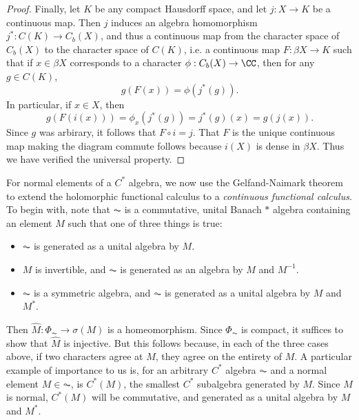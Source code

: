 \begin{proof}
    Finally, let $K$ be any compact Hausdorff space, and let $j: X \to K$ be a continuous map. Then $j$ induces an algebra homomorphism $j^*: C(K) \to C_b(X)$, and thus a continuous map from the character space of $C_b(X)$ to the character space of $C(K)$, i.e. a continuous map $F: \beta X \to K$ such that if $x \in \beta X$ corresponds to a character $\phi: C_b(X) \to \CC$, then for any $g \in C(K)$,
    \[ g(F(x)) = \phi(j^*(g)). \]
    In particular, if $x \in X$, then
    \[ g(F(i(x))) = \phi_x(j^*(g)) = j^*(g)(x) = g(j(x)). \]
    Since $g$ was arbirary, it follows that $F \circ i = j$. That $F$ is the unique continuous map making the diagram commute follows because $i(X)$ is dense in $\beta X$. Thus we have verified the universal property.
\end{proof}

For normal elements of a $C^*$ algebra, we now use the Gelfand-Naimark theorem to extend the holomorphic functional calculus to a \emph{continuous functional calculus}. To begin with, note that $\AC$ is a commutative, unital Banach $*$ algebra containing an element $M$ such that one of three things is true:
%
\begin{itemize}
    \item $\AC$ is generated as a unital algebra by $M$.
    \item $M$ is invertible, and $\AC$ is generated as an algebra by $M$ and $M^{-1}$.
    \item $\AC$ is a symmetric algebra, and $\AC$ is generated as a unital algebra by $M$ and $M^*$.
\end{itemize}
%
Then $\widehat{M}: \Phi_{\AC} \to \sigma(M)$ is a homeomorphism. Since $\Phi_{\AC}$ is compact, it suffices to show that $\widehat{M}$ is injective. But this follows because, in each of the three cases above, if two characters agree at $M$, they agree on the entirety of $M$. A particular example of importance to us is, for an arbitrary $C^*$ algebra $\AC$ and a normal element $M \in \AC$, is $C^*(M)$, the smallest $C^*$ subalgebra generated by $M$. Since $M$ is normal, $C^*(M)$ will be commutative, and generated as a unital algebra by $M$ and $M^*$.

